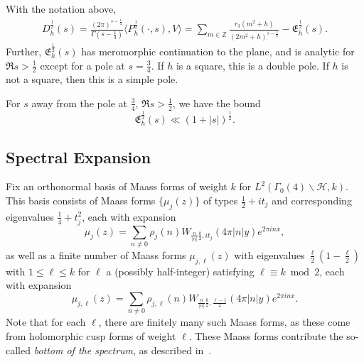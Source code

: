 \begin{proposition}\label{prop:nonspectral_analytic_props_dim_3}
  With the notation above,
  \begin{equation}
    \begin{split}
      D^{\frac{1}{2}}_h(s) = \frac{(2\pi)^{s - \frac{1}{4}}}{\Gamma(s - \frac{1}{4})}
      \langle P_h^{\frac{1}{2}}(\cdot, s), V\rangle
      =
      \sum_{m \in \mathbb{Z}}
      \frac{r_{3}(m^2 + h)}{(2m^2 + h)^{s - \frac{1}{4}}}
      -
      \mathfrak{E}_h^{\frac{1}{2}}(s).
    \end{split}
  \end{equation}
  Further, $\mathfrak{E}_h^{\frac{1}{2}}(s)$ has meromorphic continuation to the plane,
  and is analytic for $\Re s > \frac{1}{2}$ except for a pole at $s = \frac{3}{4}$.
  If $h$ is a square, this is a double pole.
  If $h$ is not a square, then this is a simple pole.

  For $s$ away from the pole at $\tfrac{3}{4}$, $\Re s > \frac{1}{2}$, we have the bound
  \begin{equation}
    \mathfrak{E}_h^{\frac{1}{2}}(s) \ll (1 + \lvert s \rvert)^{\frac{1}{2}}.
  \end{equation}
\end{proposition}




\subsection{Spectral Expansion}

Fix an orthonormal basis of Maass forms of weight $k$ for $L^2(\Gamma_0(4)\backslash
\mathcal{H}, k)$.
This basis consists of Maass forms $\{\mu_j(z)\}$ of types $\frac{1}{2} + it_j$ and
corresponding eigenvalues $\frac{1}{4} + t_j^2$, each with expansion
\begin{equation}
  \mu_j(z) = \sum_{n \neq 0} \rho_j(n) W_{\frac{n}{\lvert n \rvert} \frac{k}{2},
  it_j}(4\pi \lvert n \rvert y) e^{2\pi i n x},
\end{equation}
as well as a finite number of Maass forms $\mu_{j,\ell}(z)$ with eigenvalues
$\frac{\ell}{2}(1 - \frac{\ell}{2})$ with $1 \leq \ell \leq k$ for $\ell$ a (possibly
half-integer) satisfying $\ell \equiv k \bmod 2$, each with expansion
\begin{equation}
  \mu_{j, \ell}(z) = \sum_{n \neq 0} \rho_{j,\ell}(n) W_{\frac{n}{\lvert n \rvert}
  \frac{k}{2}, \frac{\ell-1}{2}}(4\pi \lvert n \rvert y) e^{2\pi i n x}.
\end{equation}
Note that for each $\ell$, there are finitely many such Maass forms, as these come from
holomorphic cusp forms of weight $\ell$.
These Maass forms contribute the so-called \emph{bottom of the spectrum}, as described
in~\cite[Chapter 3]{GoldfeldHundleyI}.



